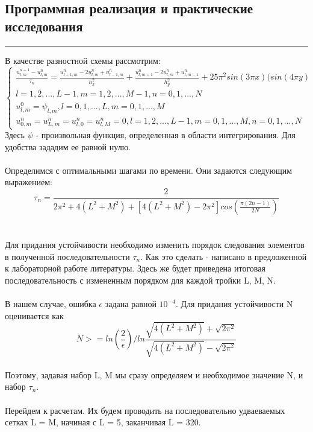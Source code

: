 \documentclass[12pt,a4paper, titlepage]{article}
\begin{document}
\subsection*{Программная реализация и практические исследования}
\noindent\rule{\textwidth}{1pt}
В качестве разностной схемы рассмотрим:
\begin{equation}
\begin{cases}
\frac{u^{n+1}_{l, m} - u^n_{l, m}}{\tau_n} = \frac{u^n_{l+1, m} - 2 u^n_{l, m} + u^n_{l-1, m}}{h_x^2} + \frac{u^n_{l, m+1} - 2 u^n_{l, m} + u^n_{l, m-1}}{h_y^2} + 25 \pi^2 sin(3\pi x)(sin(4\pi y)
\\
l = 1, 2, ..., L-1, m = 1, 2, ..., M-1, n = 0, 1, ..., N
\\
u^0_{l, m} = \psi_{l, m}, l = 0, 1, ..., L, m = 0, 1, ..., M
\\
u^n_{0, m} = u^n_{L, m} = u^n_{l, 0} = u^n_{l, M} = 0, l = 1, 2, ..., L-1, m = 0, 1, ..., M, n = 0, 1, ..., N
\end{cases}
\end{equation}
Здесь $\psi$ - произвольная функция, определенная в области интегрирования. Для удобства зададим ее равной нулю.
\\
\\
Определимся с оптимальными шагами по времени. Они задаются следующим выражением:
\begin{equation}
	\tau_n = \frac{2}{2 \pi^2 + 4(L^2+M^2) + [4(L^2+M^2) - 2 \pi^2] cos(\frac{\pi(2 n - 1)}{2 N})}
\end{equation}
\\
\\
Для придания устойчивости необходимо изменить порядок следования элементов в полученной последовательности $\tau_n$. Как это сделать - написано в предложенной к лабораторной работе литературы. Здесь же будет приведена итоговая последовательность с измененным порядком для каждой тройки L, M, N.
\\
\\
В нашем случае, ошибка $\epsilon$ задана равной $10^{-4}$. Для придания устойчивости N оценивается как 
\begin{equation}
	N >= ln(\frac{2}{\epsilon}) / ln\frac{\sqrt{4(L^2+M^2)} + \sqrt{2 \pi^2}}{\sqrt{4(L^2+M^2)} - \sqrt{2\pi^2}}
\end{equation}
\\
Поэтому, задавая набор L, M мы сразу определяем и необходимое значение N, и набор $\tau_n$.
\\
\\
Перейдем к расчетам. Их будем проводить на последовательно удваеваемых сетках L = M, начиная с L = 5, заканчивая L = 320.
\end{document}
